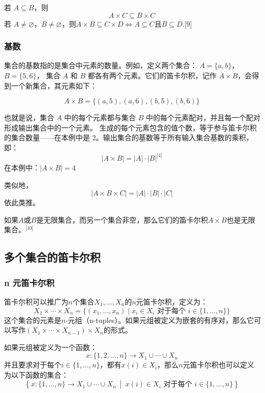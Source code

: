 若 \( A \subseteq B \)，则  
  \[
  A \times C \subseteq B \times C~
  \]
若 \( A \ne \varnothing \)，\( B \ne \varnothing \)，则\(A\times B \subseteq C \times D \iff A \subseteq C\)且\(B \subseteq D\).\(\text{[9]}\)
\subsubsection{基数}  
集合的基数指的是集合中元素的数量。例如，定义两个集合：  
\( A = \{a, b\} \)，\( B = \{5, 6\} \)，  
集合 \( A \) 和 \( B \) 都各有两个元素。它们的笛卡尔积，记作 \( A \times B \)，会得到一个新集合，其元素如下：

\[
A \times B = \{(a,5), (a,6), (b,5), (b,6)\}~
\]

也就是说，集合 \( A \) 中的每个元素都与集合 \( B \) 中的每个元素配对，并且每一个配对形成输出集合中的一个元素。  
生成的每个元素包含的值个数，等于参与笛卡尔积的集合数量——在本例中是 2。输出集合的基数等于所有输入集合基数的乘积，即：
\[
|A \times B| = |A| \cdot |B|^\text{[4]}~
\]
在本例中：\(|A \times B| = 4\)

类似地，
\[
|A \times B \times C| = |A| \cdot |B| \cdot |C|~
\]
依此类推。

如果\( A \)或\( B \)是无限集合，而另一个集合非空，那么它们的笛卡尔积\( A \times B \)也是无限集合。\(^\text{[10]}\)

\subsection{多个集合的笛卡尔积} 
\subsubsection{n 元笛卡尔积}
笛卡尔积可以推广为\( n \)个集合\( X_1, \dots, X_n \)的\(n\)元笛卡尔积，定义为：
\[
X_1 \times \cdots \times X_n = \{(x_1, \dots, x_n) \mid x_i \in X_i \text{ 对于每个 } i \in \{1, \dots, n\} \}~
\]
这个集合的元素是\( n \)-元组（n-tuples）。如果元组被定义为嵌套的有序对，那么它可以写作\((X_1 \times \cdots \times X_{n-1}) \times X_n\)的形式。

如果元组被定义为一个函数：  
\[
x: \{1, 2, \dots, n\} \to X_1 \cup \cdots \cup X_n~
\]  
并且要求对于每个\( i \in \{1, \dots, n\} \)，都有\( x(i) \in X_i \)，那么\(n\)元笛卡尔积也可以定义为以下函数的集合：
\[
\left\{ x: \{1, \dots, n\} \to X_1 \cup \cdots \cup X_n\ \middle|\ x(i) \in X_i \text{ 对于每个 } i \in \{1, \dots, n\} \right\}~
\]